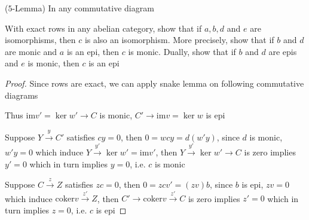 \documentclass{article}
\newenvironment{exercise}[2][Exercise]{\begin{trivlist}
\item[\hskip \labelsep {\bfseries #1}\hskip \labelsep {\bfseries #2.}]}{\end{trivlist}}
\theoremstyle{definition}
\theoremstyle{remark}
\theoremstyle{definition}
\begin{document}
\begin{exercise}{\textbf{1.3.3}}($5$-Lemma) In any commutative diagram
\begin{center}
\end{center}
With exact rows in any abelian category, show that if $a,b,d$ and $e$ are isomorphisms, then $c$ is also an isomorphism. More precisely, show that if $b$ and $d$ are monic and $a$ is an epi, then $c$ is monic. Dually, show that if $b$ and $d$ are epis and $e$ is monic, then $c$ is an epi
\end{exercise}

\begin{proof}
Since rows are exact, we can apply snake lemma on following commutative diagrams
\begin{center}
\end{center}
\begin{center}
\end{center}
Thus $\mathrm{im}v'=\ker w'\to C$ is monic, $C'\to\mathrm{im}v=\ker w$ is epi \par
Suppose $Y\xrightarrow{y}C'$ satisfies $cy=0$, then $0=wcy=d(w'y)$, since $d$ is monic, $w'y=0$ which induce $Y\xrightarrow{y'}\ker w'=\mathrm{im}v'$, then $Y\xrightarrow{y'}\ker w'\to C$ is zero implies $y'=0$ which in turn implies $y=0$, i.e. $c$ is monic \par
Suppose $C\xrightarrow{z}Z$ satisfies $zc=0$, then $0=zcv'=(zv)b$, since $b$ is epi, $zv=0$ which induce 
$\mathrm{coker}v\xrightarrow{z'}Z$, then $C'\to\mathrm{coker}v\xrightarrow{z'}C$ is zero implies $z'=0$ which in turn implies $z=0$, i.e. $c$ is epi
\end{proof}
\end{document}
